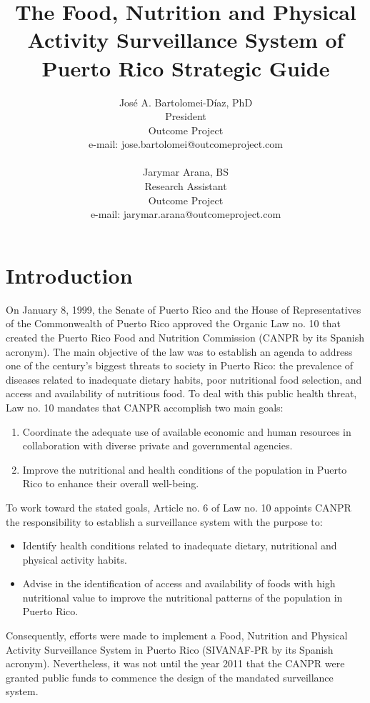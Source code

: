 \documentclass[12pt,letterpaper]{report}
\author{Jos\'{e} A. Bartolomei-D\'{i}az, PhD \\
President\\ Outcome Project\\
e-mail: jose.bartolomei@outcomeproject.com\\
\\
Jarymar Arana, BS\\
Research Assistant \\ Outcome Project\\            
e-mail: jarymar.arana@outcomeproject.com}
\title{\textbf{The Food, Nutrition and Physical Activity Surveillance System of Puerto Rico Strategic Guide}}
\begin{document}
\maketitle%

\doublespacing
\tableofcontents
\listoftables

\newpage
\section{Introduction}

On January 8, 1999, the Senate of Puerto Rico and the House of Representatives of the Commonwealth of Puerto Rico approved the Organic Law no. 10 that created the Puerto Rico Food and Nutrition Commission (CANPR by its Spanish acronym). The main objective of the law was to establish an agenda to address one of the century's biggest threats to society in Puerto Rico: the prevalence of diseases related to inadequate dietary habits, poor nutritional food selection, and access and availability of nutritious food. To deal with this public health threat, Law no. 10 mandates that CANPR accomplish two main goals:

\begin{enumerate}
\item Coordinate the adequate use of available economic and human resources in collaboration with diverse private and governmental agencies.

\item Improve the nutritional and health conditions of the population in Puerto Rico to enhance their overall well-being.
\end{enumerate}

To work toward the stated goals, Article no. 6 of Law no. 10 appoints CANPR the responsibility to establish a surveillance system with the purpose to: 
\begin{itemize}
\item Identify health conditions related to inadequate dietary, nutritional and physical activity habits.
\item Advise in the identification of access and availability of foods with high nutritional value to improve the nutritional patterns of the population in Puerto Rico.
\end{itemize} 

Consequently, efforts were made to implement a Food, Nutrition and Physical Activity Surveillance System in Puerto Rico (SIVANAF-PR by its Spanish acronym). Nevertheless, it was not until the year 2011 that the CANPR were granted public funds to commence the design of the mandated surveillance system.
\end{document}
